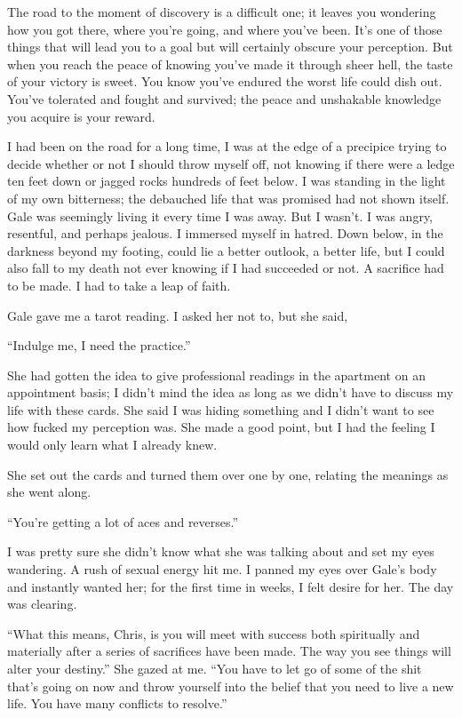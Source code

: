 The road to the moment of discovery is a difficult one; it leaves you
wondering how you got there, where you're going, and where you've been.
It's one of those things that will lead you to a goal but will certainly
obscure your perception. But when you reach the peace of knowing you've
made it through sheer hell, the taste of your victory is sweet. You know
you've endured the worst life could dish out. You've tolerated and
fought and survived; the peace and unshakable knowledge you acquire is
your reward.

I had been on the road for a long time, I was at the edge of a precipice
trying to decide whether or not I should throw myself off, not knowing
if there were a ledge ten feet down or jagged rocks hundreds of feet
below. I was standing in the light of my own bitterness; the debauched
life that was promised had not shown itself. Gale was seemingly living
it every time I was away. But I wasn't. I was angry, resentful, and
perhaps jealous. I immersed myself in hatred. Down below, in the
darkness beyond my footing, could lie a better outlook, a better life,
but I could also fall to my death not ever knowing if I had succeeded or
not. A sacrifice had to be made. I had to take a leap of faith.

Gale gave me a tarot reading. I asked her not to, but she said,

``Indulge me, I need the practice.''

She had gotten the idea to give professional readings in the apartment
on an appointment basis; I didn't mind the idea as long as we didn't
have to discuss my life with these cards. She said I was hiding
something and I didn't want to see how fucked my perception was. She
made a good point, but I had the feeling I would only learn what I
already knew.

She set out the cards and turned them over one by one, relating the
meanings as she went along.

``You're getting a lot of aces and reverses.''

I was pretty sure she didn't know what she was talking about and set my
eyes wandering. A rush of sexual energy hit me. I panned my eyes over
Gale's body and instantly wanted her; for the first time in weeks, I
felt desire for her. The day was clearing.

``What this means, Chris, is you will meet with success both spiritually
and materially after a series of sacrifices have been made. The way you
see things will alter your destiny.'' She gazed at me. ``You have to let
go of some of the shit that's going on now and throw yourself into the
belief that you need to live a new life. You have many conflicts to
resolve.''

